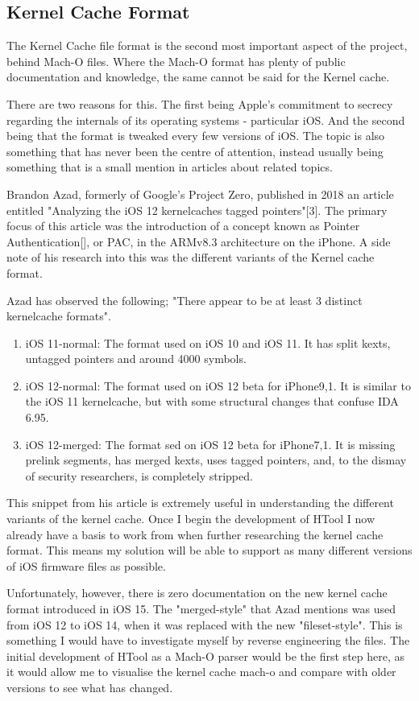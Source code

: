 \subsection{Kernel Cache Format}

The Kernel Cache file format is the second most important aspect of the project, behind Mach-O files. Where the Mach-O format has plenty of public documentation and knowledge, the same cannot be said for the Kernel cache. 

There are two reasons for this. The first being Apple's commitment to secrecy regarding the internals of its operating systems - particular iOS. And the second being that the format is tweaked every few versions of iOS. The topic is also something that has never been the centre of attention, instead usually being something that is a small mention in articles about related topics. 

Brandon Azad, formerly of Google's Project Zero, published in 2018 an article entitled "Analyzing the iOS 12 kernelcaches tagged pointers"[3]. The primary focus of this article was the introduction of a concept known as Pointer Authentication[], or PAC, in the ARMv8.3 architecture on the iPhone. A side note of his research into this was the different variants of the Kernel cache format.

Azad has observed the following; "There appear to be at least 3 distinct kernelcache formats".

\begin{enumerate}
	\item iOS 11-normal: The format used on iOS 10 and iOS 11. It has split kexts, untagged pointers and around 4000 symbols.
	\item iOS 12-normal: The format used on iOS 12 beta for iPhone9,1. It is similar to the iOS 11 kernelcache, but with some structural changes that confuse IDA 6.95.
	\item iOS 12-merged: The format sed on iOS 12 beta for iPhone7,1. It is missing prelink segments, has merged kexts, uses tagged pointers, and, to the dismay of security researchers, is completely stripped.
\end{enumerate}
 
 This snippet from his article is extremely useful in understanding the different variants of the kernel cache. Once I begin the development of HTool I now already have a basis to work from when further researching the kernel cache format. This means my solution will be able to support as many different versions of iOS firmware files as possible. 
 
 Unfortunately, however, there is zero documentation on the new kernel cache format introduced in iOS 15. The "merged-style" that Azad mentions was used from iOS 12 to iOS 14, when it was replaced with the new "fileset-style". This is something I would have to investigate myself by reverse engineering the files. The initial development of HTool as a Mach-O parser would be the first step here, as it would allow me to visualise the kernel cache mach-o and compare with older versions to see what has changed. 
 
 